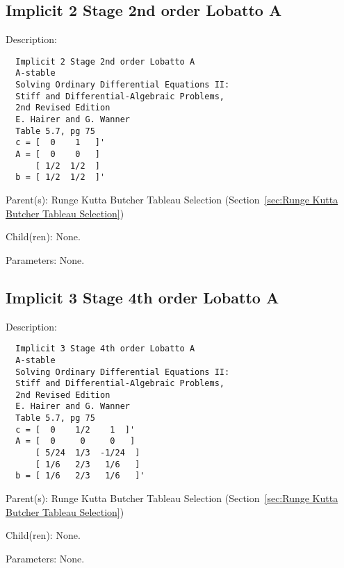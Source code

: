 \subsection{Implicit 2 Stage 2nd order Lobatto A}
\label{sec:Implicit 2 Stage 2nd order Lobatto A}

\begin{list}{}
  {\setlength{\leftmargin}{1.0in}
   \setlength{\labelwidth}{0.75in}
   \setlength{\labelsep}{0.125in}}
  \item[Description:]
\begin{verbatim}
  Implicit 2 Stage 2nd order Lobatto A
  A-stable
  Solving Ordinary Differential Equations II:
  Stiff and Differential-Algebraic Problems,
  2nd Revised Edition
  E. Hairer and G. Wanner
  Table 5.7, pg 75
  c = [  0    1   ]'
  A = [  0    0   ]
      [ 1/2  1/2  ]
  b = [ 1/2  1/2  ]'
\end{verbatim}
  \item[Parent(s):]
    Runge Kutta Butcher Tableau Selection (Section~\ref{sec:Runge Kutta Butcher Tableau Selection})
  \item[Child(ren):]
    None. 
  \item[Parameters:]
    None. 
\end{list}

\subsection{Implicit 3 Stage 4th order Lobatto A}
\label{sec:Implicit 3 Stage 4th order Lobatto A}

\begin{list}{}
  {\setlength{\leftmargin}{1.0in}
   \setlength{\labelwidth}{0.75in}
   \setlength{\labelsep}{0.125in}}
  \item[Description:]
\begin{verbatim}
  Implicit 3 Stage 4th order Lobatto A
  A-stable
  Solving Ordinary Differential Equations II:
  Stiff and Differential-Algebraic Problems,
  2nd Revised Edition
  E. Hairer and G. Wanner
  Table 5.7, pg 75
  c = [  0    1/2    1  ]'
  A = [  0     0     0   ]
      [ 5/24  1/3  -1/24  ]
      [ 1/6   2/3   1/6   ]
  b = [ 1/6   2/3   1/6   ]'
\end{verbatim}
  \item[Parent(s):]
    Runge Kutta Butcher Tableau Selection (Section~\ref{sec:Runge Kutta Butcher Tableau Selection})
  \item[Child(ren):]
    None. 
  \item[Parameters:]
    None. 
\end{list}

